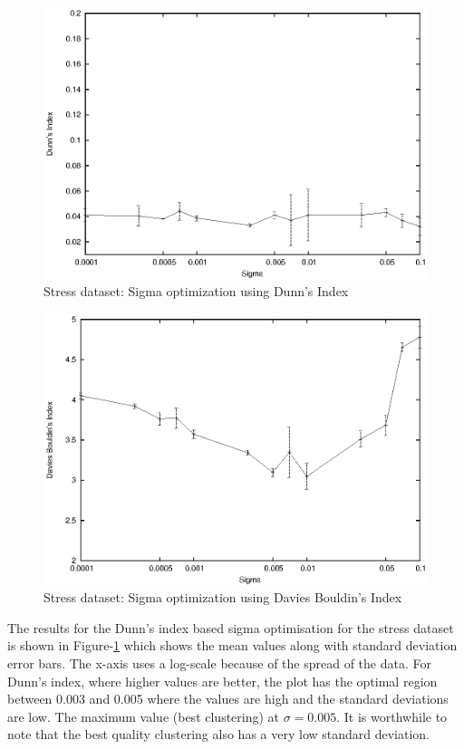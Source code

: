\begin{figure}[p]
 \centering
 \includegraphics[scale=1.0]{images_only/semisup/results/plots/stress_dunn.eps}
 \caption{Stress dataset: Sigma optimization using Dunn's Index}
 \label{fig:stress_sigma_opt_dunn}
\end{figure}

\begin{figure}[p]
 \centering
 \includegraphics[scale=1.0]{images_only/semisup/results/plots/stress_davies.eps}
 \caption{Stress dataset: Sigma optimization using Davies Bouldin's Index}
 \label{fig:stress_sigma_opt_dav}
\end{figure}

The results for the Dunn's index based sigma optimisation for the stress dataset is shown in Figure-\ref{fig:stress_sigma_opt_dunn} which shows the mean values along with standard deviation error bars. 
The x-axis uses a log-scale because of the spread of the data.  For Dunn's index, where higher values are better, the plot has the optimal region between 0.003 and 0.005 where the values are high and the standard deviations are low.
The maximum value (best clustering) at $\sigma=0.005$. It is worthwhile to note that the best quality clustering also has a very low standard deviation.

